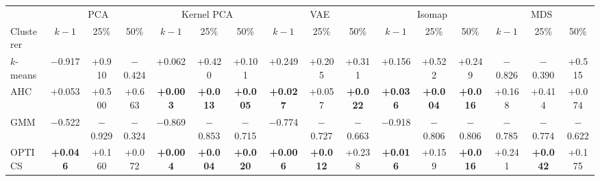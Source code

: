 \begin{tabular}{lccccccccccccccc}
\toprule
 & \multicolumn{3}{c}{PCA} & \multicolumn{3}{c}{Kernel PCA} & \multicolumn{3}{c}{VAE} & \multicolumn{3}{c}{Isomap} & \multicolumn{3}{c}{MDS} \\
\cmidrule(lr){2-4} \cmidrule(lr){5-7} \cmidrule(lr){8-10} \cmidrule(lr){11-13} \cmidrule(lr){14-16}
Clusterer & $k-1$ & 25\% & 50\% & $k-1$ & 25\% & 50\% & $k-1$ & 25\% & 50\% & $k-1$ & 25\% & 50\% & $k-1$ & 25\% & 50\% \\
\midrule
$k$-means & $-$0.917 & +0.910 & $-$0.424 & +0.062 & +0.420 & +0.101 & +0.249 & +0.205 & +0.311 & +0.156 & +0.522 & +0.249 & $-$0.826 & $-$0.390 & +0.515 \\
AHC & +0.053 & +0.500 & +0.663 & {\bfseries\boldmath +0.003} & {\bfseries\boldmath +0.013} & {\bfseries\boldmath +0.005} & {\bfseries\boldmath +0.027} & +0.057 & {\bfseries\boldmath +0.022} & {\bfseries\boldmath +0.036} & {\bfseries\boldmath +0.004} & {\bfseries\boldmath +0.016} & +0.168 & +0.414 & +0.074 \\
GMM & $-$0.522 & $-$0.929 & $-$0.324 & $-$0.869 & $-$0.853 & $-$0.715 & $-$0.774 & $-$0.727 & $-$0.663 & $-$0.918 & $-$0.806 & $-$0.806 & $-$0.785 & $-$0.774 & $-$0.622 \\
OPTICS & {\bfseries\boldmath +0.046} & +0.160 & +0.072 & {\bfseries\boldmath +0.004} & {\bfseries\boldmath +0.004} & {\bfseries\boldmath +0.020} & {\bfseries\boldmath +0.006} & {\bfseries\boldmath +0.012} & +0.238 & {\bfseries\boldmath +0.016} & +0.159 & {\bfseries\boldmath +0.016} & +0.241 & {\bfseries\boldmath +0.042} & +0.175 \\
\bottomrule\end{tabular}
